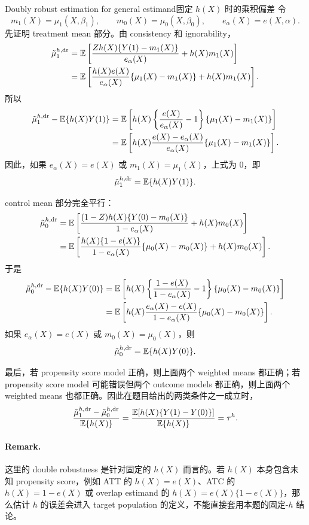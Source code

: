 \begin{exercisesolution}{Doubly robust estimation for general estimand}{固定 $h(X)$ 时的乘积偏差}
令
\[
m_1(X)=\mu_1(X,\beta_1),\qquad
m_0(X)=\mu_0(X,\beta_0),\qquad
e_\alpha(X)=e(X,\alpha).
\]
先证明 treatment mean 部分。由 consistency 和 ignorability，
\begin{align*}
\tilde{\mu}_1^{h,\textup{dr}}
&=\mathbb{E}\left[
\frac{Zh(X)\{Y(1)-m_1(X)\}}{e_\alpha(X)}
+h(X)m_1(X)
\right] \\
&=\mathbb{E}\left[
\frac{h(X)e(X)}{e_\alpha(X)}
\{\mu_1(X)-m_1(X)\}
+h(X)m_1(X)
\right].
\end{align*}
所以
\begin{align*}
\tilde{\mu}_1^{h,\textup{dr}}-\mathbb{E}\{h(X)Y(1)\}
&=\mathbb{E}\left[
h(X)\left\{\frac{e(X)}{e_\alpha(X)}-1\right\}
\{\mu_1(X)-m_1(X)\}
\right] \\
&=\mathbb{E}\left[
h(X)\frac{e(X)-e_\alpha(X)}{e_\alpha(X)}
\{\mu_1(X)-m_1(X)\}
\right].
\end{align*}
因此，如果 $e_\alpha(X)=e(X)$ 或 $m_1(X)=\mu_1(X)$，上式为 $0$，即
\[
\tilde{\mu}_1^{h,\textup{dr}}=\mathbb{E}\{h(X)Y(1)\}.
\]

control mean 部分完全平行：
\begin{align*}
\tilde{\mu}_0^{h,\textup{dr}}
&=\mathbb{E}\left[
\frac{(1-Z)h(X)\{Y(0)-m_0(X)\}}{1-e_\alpha(X)}
+h(X)m_0(X)
\right] \\
&=\mathbb{E}\left[
\frac{h(X)\{1-e(X)\}}{1-e_\alpha(X)}
\{\mu_0(X)-m_0(X)\}
+h(X)m_0(X)
\right].
\end{align*}
于是
\begin{align*}
\tilde{\mu}_0^{h,\textup{dr}}-\mathbb{E}\{h(X)Y(0)\}
&=\mathbb{E}\left[
h(X)\left\{\frac{1-e(X)}{1-e_\alpha(X)}-1\right\}
\{\mu_0(X)-m_0(X)\}
\right] \\
&=\mathbb{E}\left[
h(X)\frac{e_\alpha(X)-e(X)}{1-e_\alpha(X)}
\{\mu_0(X)-m_0(X)\}
\right].
\end{align*}
如果 $e_\alpha(X)=e(X)$ 或 $m_0(X)=\mu_0(X)$，则
\[
\tilde{\mu}_0^{h,\textup{dr}}=\mathbb{E}\{h(X)Y(0)\}.
\]

最后，若 propensity score model 正确，则上面两个 weighted means 都正确；若 propensity score model 可能错误但两个 outcome models 都正确，则上面两个 weighted means 也都正确。因此在题目给出的两类条件之一成立时，
\[
\frac{\tilde{\mu}_1^{h,\textup{dr}}-\tilde{\mu}_0^{h,\textup{dr}}}
     {\mathbb{E}\{h(X)\}}
=\frac{\mathbb{E}[h(X)\{Y(1)-Y(0)\}]}
       {\mathbb{E}\{h(X)\}}
=\tau^h.
\]

\paragraph{Remark.}
这里的 double robustness 是针对固定的 $h(X)$ 而言的。若 $h(X)$ 本身包含未知 propensity score，例如 ATT 的 $h(X)=e(X)$、ATC 的 $h(X)=1-e(X)$ 或 overlap estimand 的 $h(X)=e(X)\{1-e(X)\}$，那么估计 $h$ 的误差会进入 target population 的定义，不能直接套用本题的固定-$h$ 结论。
\end{exercisesolution}

